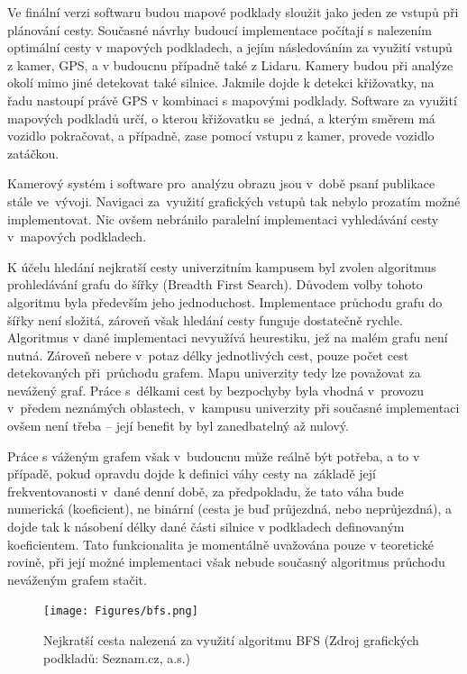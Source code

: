 \documentclass[czech, bachelor]{diploma}
\begin{document}
Ve finální verzi softwaru budou mapové podklady sloužit jako jeden ze vstupů při plánování cesty. Současné návrhy budoucí
implementace počítají s nalezením optimální cesty v mapových podkladech, a jejím následováním za využití vstupů z kamer, GPS, 
a v budoucnu případně také z Lidaru. Kamery budou při analýze okolí mimo jiné detekovat také silnice. Jakmile dojde k detekci
křižovatky, na řadu nastoupí právě GPS v kombinaci s mapovými podklady. Software za využití mapových podkladů určí, o kterou
křižovatku se~jedná, a kterým směrem má vozidlo pokračovat, a případně, zase pomocí vstupu z kamer, provede vozidlo zatáčkou.

Kamerový systém i software pro~analýzu obrazu jsou v~době psaní publikace stále ve~vývoji. Navigaci za~využití grafických vstupů
tak nebylo prozatím možné implementovat. Nic ovšem nebránilo paralelní implementaci vyhledávání cesty v~mapových podkladech.

K účelu hledání nejkratší cesty univerzitním kampusem byl zvolen algoritmus prohledávání grafu do šířky (Breadth First Search).
Důvodem volby tohoto algoritmu byla především jeho jednoduchost. Implementace průchodu grafu do šířky není složitá, zároveň však
hledání cesty funguje dostatečně rychle. Algoritmus v dané implementaci nevyužívá heurestiku, jež na malém grafu není nutná.
Zároveň nebere v~potaz délky jednotlivých cest, pouze počet cest detekovaných při~průchodu grafem. Mapu univerzity tedy lze 
považovat za nevážený graf. Práce s~délkami cest by bezpochyby byla vhodná v~provozu v~předem neznámých oblastech, v~kampusu 
univerzity při současné implementaci ovšem není třeba -- její benefit by byl zanedbatelný až nulový.

Práce s váženým grafem však v~budoucnu může reálně být potřeba, a to v případě, pokud opravdu dojde k definici váhy cesty
na~základě její frekventovanosti v~dané denní době, za předpokladu, že tato váha bude numerická (koeficient), ne binární 
(cesta je buď průjezdná, nebo neprůjezdná), a dojde tak k násobení délky dané části silnice v podkladech definovaným koeficientem.
Tato funkcionalita je momentálně uvažována pouze v teoretické rovině, při její možné implementaci však nebude současný algoritmus
průchodu neváženým grafem stačit.

\begin{figure}
    \centering
    \texttt{[image: Figures/bfs.png]}
    \caption{Nejkratší cesta nalezená za využití algoritmu BFS (Zdroj grafických podkladů: Seznam.cz, a.s.)}
    \label{fig:bfs}
\end{figure}
\end{document}
